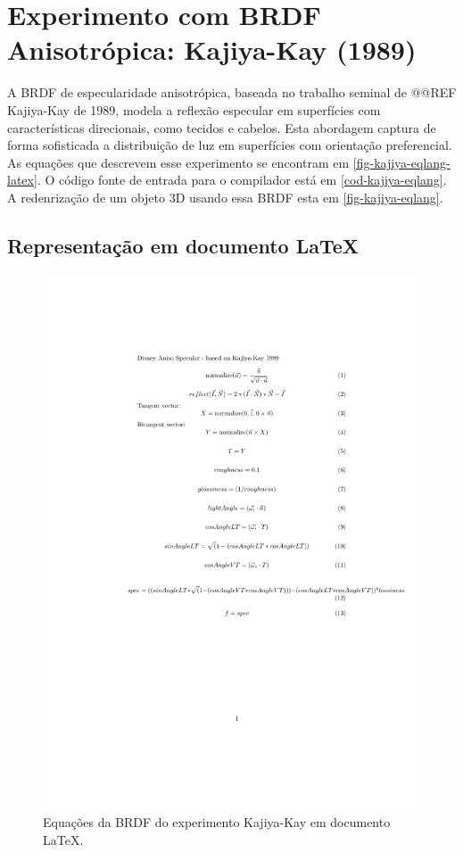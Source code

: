 \section{Experimento com BRDF Anisotrópica: Kajiya-Kay (1989)}

A BRDF de especularidade anisotrópica, baseada no trabalho seminal de @@REF Kajiya-Kay de 1989, modela a reflexão especular em superfícies com características direcionais, como tecidos e cabelos. Esta abordagem captura de forma
sofisticada a distribuição de luz em superfícies com orientação preferencial. As equações que descrevem esse experimento se encontram em \autoref{fig-kajiya-eqlang-latex}. O código fonte de entrada para o compilador está em \autoref{cod-kajiya-eqlang}. A redenrização de um objeto 3D usando essa BRDF esta em \autoref{fig-kajiya-eqlang}.

\subsection{Representação em documento \LaTeX{}}
\begin{figure}[H]
    \caption{\label{fig-kajiya-eqlang-latex} \small Equações da BRDF do experimento Kajiya-Kay em documento \LaTeX{}.}
    \begin{center}
        \includegraphics[scale=1.1,width=\textwidth]{./Imagens/brdfs/aniso.pdf}
    \end{center}
\end{figure}

